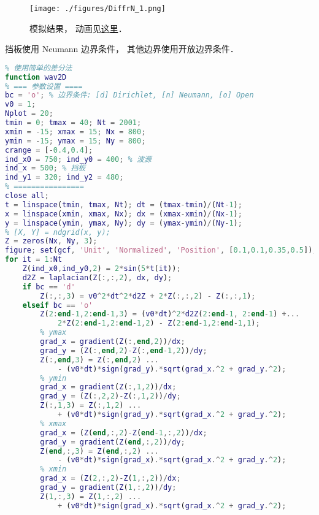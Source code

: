 
\begin{issues}
\issueDraft
\end{issues}


\begin{figure}[ht]
\centering
\texttt{[image: ./figures/DiffrN\_1.png]}
\caption{模拟结果， 动画见\href{https://wuli.wiki/apps/diffrac.html}{这里}．} \label{DiffrN_fig1}
\end{figure}

挡板使用 Neumann 边界条件， 其他边界使用开放边界条件．

\begin{lstlisting}[language=matlab]
% 二维波动方程的简单数值解
% 使用简单的差分法
function wav2D
% === 参数设置 ====
bc = 'o'; % 边界条件: [d] Dirichlet, [n] Neumann, [o] Open
v0 = 1;
Nplot = 20;
tmin = 0; tmax = 40; Nt = 2001;
xmin = -15; xmax = 15; Nx = 800;
ymin = -15; ymax = 15; Ny = 800;
crange = [-0.4,0.4];
ind_x0 = 750; ind_y0 = 400; % 波源
ind_x = 500; % 挡板
ind_y1 = 320; ind_y2 = 480;
% ================
close all;
t = linspace(tmin, tmax, Nt); dt = (tmax-tmin)/(Nt-1);
x = linspace(xmin, xmax, Nx); dx = (xmax-xmin)/(Nx-1);
y = linspace(ymin, ymax, Ny); dy = (ymax-ymin)/(Ny-1);
% [X, Y] = ndgrid(x, y);
Z = zeros(Nx, Ny, 3);
figure; set(gcf, 'Unit', 'Normalized', 'Position', [0.1,0.1,0.35,0.5]);
for it = 1:Nt
    Z(ind_x0,ind_y0,2) = 2*sin(5*t(it));
    d2Z = laplacian(Z(:,:,2), dx, dy);
    if bc == 'd'
        Z(:,:,3) = v0^2*dt^2*d2Z + 2*Z(:,:,2) - Z(:,:,1);
    elseif bc == 'o'
        Z(2:end-1,2:end-1,3) = (v0*dt)^2*d2Z(2:end-1, 2:end-1) +...
            2*Z(2:end-1,2:end-1,2) - Z(2:end-1,2:end-1,1);
        % ymax
        grad_x = gradient(Z(:,end,2))/dx;
        grad_y = (Z(:,end,2)-Z(:,end-1,2))/dy;
        Z(:,end,3) = Z(:,end,2) ...
            - (v0*dt)*sign(grad_y).*sqrt(grad_x.^2 + grad_y.^2);
        % ymin
        grad_x = gradient(Z(:,1,2))/dx;
        grad_y = (Z(:,2,2)-Z(:,1,2))/dy;
        Z(:,1,3) = Z(:,1,2) ...
            + (v0*dt)*sign(grad_y).*sqrt(grad_x.^2 + grad_y.^2);
        % xmax
        grad_x = (Z(end,:,2)-Z(end-1,:,2))/dx;
        grad_y = gradient(Z(end,:,2))/dy;
        Z(end,:,3) = Z(end,:,2) ...
            - (v0*dt)*sign(grad_x).*sqrt(grad_x.^2 + grad_y.^2);
        % xmin
        grad_x = (Z(2,:,2)-Z(1,:,2))/dx;
        grad_y = gradient(Z(1,:,2))/dy;
        Z(1,:,3) = Z(1,:,2) ...
            + (v0*dt)*sign(grad_x).*sqrt(grad_x.^2 + grad_y.^2);

\end{lstlisting}
